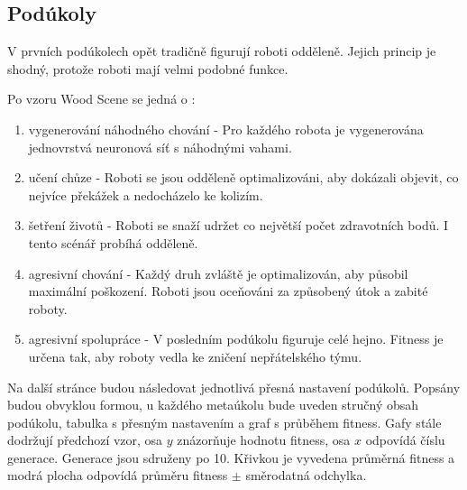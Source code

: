 \subsection*{Podúkoly}
V prvních podúkolech opět tradičně figurují roboti odděleně. Jejich princip je shodný, protože roboti mají velmi podobné funkce.
 \par 
Po vzoru Wood Scene se jedná o : 
\begin{enumerate}
	\item vygenerování náhodného chování - Pro každého robota je vygenerována jednovrstvá neuronová síť s náhodnými vahami. 
	\item učení chůze - Roboti se jsou odděleně optimalizováni, aby dokázali objevit, co nejvíce překážek a nedocházelo ke kolizím. 
	\item šetření životů - Roboti se snaží udržet co  největší počet zdravotních bodů. I tento scénář probíhá odděleně. 
	\item agresivní chování - Každý druh zvláště je optimalizován, aby působil maximální poškození. Roboti jsou oceňováni za způsobený útok a zabité roboty. 
	\item agresivní spolupráce - V posledním podúkolu figuruje celé hejno. Fitness je určena tak, aby roboty vedla ke zničení nepřátelského týmu. 
\end{enumerate}
Na další stránce budou následovat jednotlivá přesná nastavení podúkolů. Popsány budou obvyklou formou, u každého metaúkolu bude uveden stručný obsah podúkolu, tabulka s přesným nastavením a graf s průběhem fitness. Gafy stále dodržují předchozí vzor, osa $y$ znázorňuje hodnotu fitness, osa $x$ odpovídá číslu generace. Generace jsou sdruženy po  10. Křivkou je vyvedena průměrná fitness a modrá plocha odpovídá průměru fitness $\pm$ směrodatná odchylka. 
\clearpage

